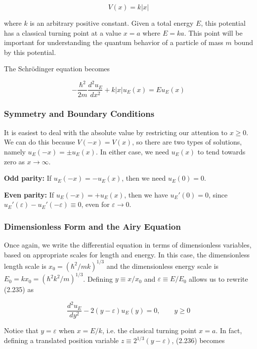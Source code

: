 \documentclass[11pt,a4paper]{article}
\begin{document}
\begin{equation}
V(x) = k|x|
\tag{2.234}
\end{equation}

where $k$ is an arbitrary positive constant. Given a total energy $E$, this potential has a classical turning point at a value $x = a$ where $E = ka$. This point will be important for understanding the quantum behavior of a particle of mass $m$ bound by this potential.

The Schrödinger equation becomes

\begin{equation}
-\frac{\hbar^2}{2m}\frac{d^2 u_E}{dx^2} + k|x|u_E(x) = Eu_E(x)
\tag{2.235}
\end{equation}

\subsubsection{Symmetry and Boundary Conditions}

It is easiest to deal with the absolute value by restricting our attention to $x \geq 0$. We can do this because $V(-x) = V(x)$, so there are two types of solutions, namely $u_E(-x) = \pm u_E(x)$. In either case, we need $u_E(x)$ to tend towards zero as $x \to \infty$.

\textbf{Odd parity:} If $u_E(-x) = -u_E(x)$, then we need $u_E(0) = 0$.

\textbf{Even parity:} If $u_E(-x) = +u_E(x)$, then we have $u_E'(0) = 0$, since $u_E'(\varepsilon) - u_E'(-\varepsilon) \equiv 0$, even for $\varepsilon \to 0$.

\subsubsection{Dimensionless Form and the Airy Equation}

Once again, we write the differential equation in terms of dimensionless variables, based on appropriate scales for length and energy. In this case, the dimensionless length scale is $x_0 = (\hbar^2/mk)^{1/3}$ and the dimensionless energy scale is $E_0 = kx_0 = (\hbar^2 k^2/m)^{1/3}$. Defining $y \equiv x/x_0$ and $\varepsilon \equiv E/E_0$ allows us to rewrite (2.235) as

\begin{equation}
\frac{d^2 u_E}{dy^2} - 2(y - \varepsilon)u_E(y) = 0, \qquad y \geq 0
\tag{2.236}
\end{equation}

Notice that $y = \varepsilon$ when $x = E/k$, i.e. the classical turning point $x = a$. In fact, defining a translated position variable $z \equiv 2^{1/3}(y - \varepsilon)$, (2.236) becomes
\end{document}
